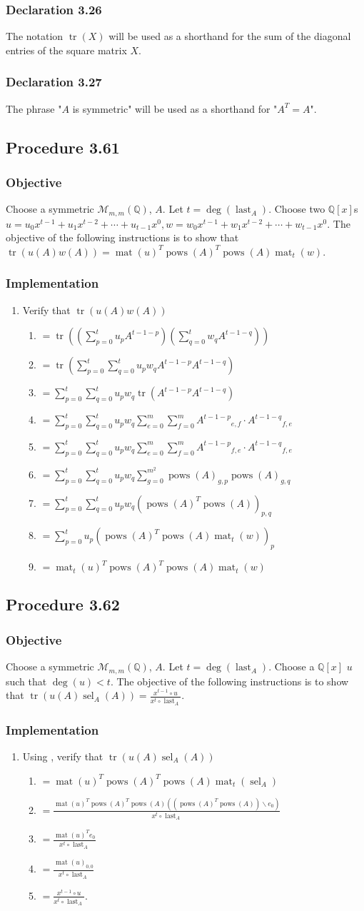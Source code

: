 \documentclass[twocolumn]{article}
\DeclareMathOperator{\mat}{mat}
\DeclareMathOperator{\tr}{tr}
\DeclareMathOperator{\pows}{pows}
\DeclareMathOperator{\sel}{sel}
\DeclareMathOperator{\last}{last}
\newcommand{\declaration}[1]{\subsubsection*{Declaration #1}\label{sec:declaration #1}}
\newcommand{\procedure}[2][]{\subsection*{Procedure #2 \ifthenelse{\equal{#1}{}}{}{(#1)}}\label{sec:procedure #2}}
\newcommand{\objective}{\subsubsection*{Objective}}
\newcommand{\implementation}{\subsubsection*{Implementation}}
\newcommand{\procedurehr}[2][]{\hyperref[sec:procedure #2]{\ifthenelse{\equal{#1}{}}{procedure #2}{#1}}}
\begin{document}
		\declaration{3.26}
			The notation $\tr(X)$ will be used as a shorthand for the sum of the diagonal entries of the square matrix $X$.
		\declaration{3.27}
			The phrase "$A$ is symmetric" will be used as a shorthand for "$A^T=A$".
		\procedure{3.61}
			\objective
				Choose a symmetric $\mathcal{M}_{m,m}(\mathbb{Q})$, $A$. Let $t=\deg(\last_A)$. Choose two $\mathbb{Q}[x]$s $u=u_0x^{t-1}+u_1x^{t-2}+\cdots+u_{t-1}x^0,w=w_0x^{t-1}+w_1x^{t-2}+\cdots+w_{t-1}x^0$. The objective of the following instructions is to show that $\tr(u(A)w(A))=\mat(u)^T\pows(A)^T\pows(A)\mat_t(w)$.
			\implementation
				\begin{enumerate}
					\item Verify that $\tr(u(A)w(A))$
					\begin{enumerate}
						\item $=\tr((\sum_{p=0}^t u_pA^{t-1-p})(\sum_{q=0}^t w_qA^{t-1-q}))$
						\item $=\tr(\sum_{p=0}^t\sum_{q=0}^t u_pw_qA^{t-1-p}A^{t-1-q})$
						\item $=\sum_{p=0}^t\sum_{q=0}^t u_pw_q\tr(A^{t-1-p}A^{t-1-q})$
						\item $=\sum_{p=0}^t\sum_{q=0}^t u_pw_q\sum_{e=0}^m\sum_{f=0}^m{A^{t-1-p}}_{e,f}\cdot{A^{t-1-q}}_{f,e}$
						\item $=\sum_{p=0}^t\sum_{q=0}^t u_pw_q\sum_{e=0}^m\sum_{f=0}^m{A^{t-1-p}}_{f,e}\cdot{A^{t-1-q}}_{f,e}$
						\item $=\sum_{p=0}^t\sum_{q=0}^t u_pw_q\sum_{g=0}^{m^2}{\pows(A)}_{g,p}{\pows(A)}_{g,q}$
						\item $=\sum_{p=0}^t\sum_{q=0}^t u_pw_q(\pows(A)^T\pows(A))_{p,q}$
						\item $=\sum_{p=0}^t u_p(\pows(A)^T\pows(A)\mat_t(w))_{p}$
						\item $=\mat_t(u)^T\pows(A)^T\pows(A)\mat_t(w)$
					\end{enumerate}
				\end{enumerate}
		\procedure{3.62}
			\objective
				Choose a symmetric $\mathcal{M}_{m,m}(\mathbb{Q})$, $A$. Let $t=\deg(\last_A)$. Choose a $\mathbb{Q}[x]$ $u$ such that $\deg(u)<t$. The objective of the following instructions is to show that $\tr(u(A)\sel_A(A))=\frac{x^{t-1}\circ u}{x^t\circ\last_A}$.
			\implementation
				\begin{enumerate}
					\item Using \procedurehr{3.61}, verify that $\tr(u(A)\sel_A(A))$
					\begin{enumerate}
						\item $=\mat(u)^T\pows(A)^T\pows(A)\mat_t(\sel_A)$
						\item $=\frac{\mat(u)^T\pows(A)^T\pows(A)((\pows(A)^T\pows(A))\backslash e_0)}{x^t\circ\last_A}$
						\item $=\frac{\mat(u)^Te_0}{x^t\circ\last_A}$
						\item $=\frac{\mat(u)_{0,0}}{x^t\circ\last_A}$
						\item $=\frac{x^{t-1}\circ u}{x^t\circ\last_A}$.
					\end{enumerate}
				\end{enumerate}
\end{document}
